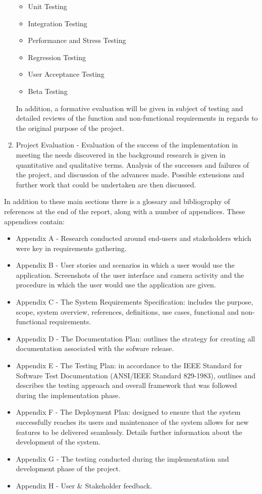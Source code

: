 \begin{enumerate}
		\begin{itemize}
			\item Unit Testing
			\item Integration Testing
			\item Performance and Stress Testing
			\item Regression Testing
			\item User Acceptance Testing
			\item Beta Testing
		\end{itemize}
	In addition, a formative evaluation will be given in subject of testing and detailed reviews of the function and non-functional requirements in regards to the original purpose of the project.
	\item Project Evaluation - Evaluation of the success of the implementation in meeting the needs discovered in the background research is given in quantitative and qualitative terms. Analysis of the successes and failures of the project, and discussion of the advances made. Possible extensions and further work that could be undertaken are then discussed.
\end{enumerate}

In addition to these main sections there is a glossary and bibliography of references at the end of the report, along with a number of appendices. These appendices contain:

\begin{itemize}
	\item Appendix A - Research conducted around end-users and stakeholders which were key in requirements gathering.
	\item Appendix B - User stories and scenarios in which a user would use the application. Screenshots of the user interface and camera activity and the procedure in which the user would use the application are given.
	\item Appendix C - The System Requirements Specification: includes the purpose, scope, system overview, references, definitions, use cases, functional and non-functional requirements.
	\item Appendix D - The Documentation Plan: outlines the strategy for creating all documentation associated with the sofware release.
	\item Appendix E - The Testing Plan: in accordance to the IEEE Standard for Software Test Documentation (ANSI/IEEE Standard 829-1983), outlines and describes the testing approach and overall framework that was followed during the implementation phase.
	\item Appendix F - The Deployment Plan: designed to ensure that the system successfully reaches its users and maintenance of the system allows for new features to be delivered seamlessly. Details further information about the development of the system.
	\item Appendix G - The testing conducted during the implementation and development phase of the project.
	\item Appendix H - User \& Stakeholder feedback.
\end{itemize}